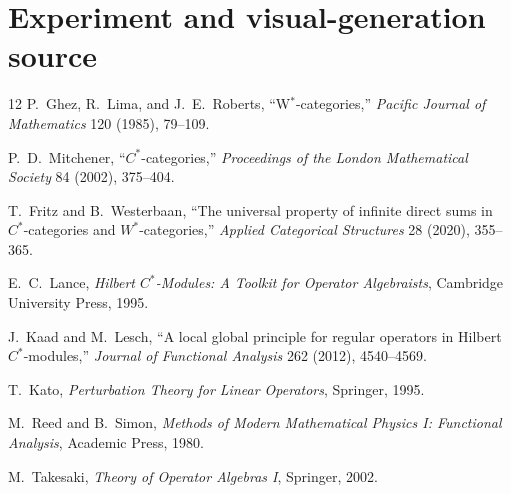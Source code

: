 \documentclass[11pt]{article}
\theoremstyle{definition}
\theoremstyle{remark}
\begin{document}
\section{Experiment and visual-generation source}

\clearpage
\begin{thebibliography}{12}
P.~Ghez, R.~Lima, and J.~E.~Roberts,
``W$^*$-categories,''
\emph{Pacific Journal of Mathematics} 120 (1985), 79--109.

P.~D.~Mitchener,
``$C^*$-categories,''
\emph{Proceedings of the London Mathematical Society} 84 (2002), 375--404.

T.~Fritz and B.~Westerbaan,
``The universal property of infinite direct sums in $C^*$-categories and $W^*$-categories,''
\emph{Applied Categorical Structures} 28 (2020), 355--365.

E.~C.~Lance,
\emph{Hilbert $C^*$-Modules: A Toolkit for Operator Algebraists},
Cambridge University Press, 1995.

J.~Kaad and M.~Lesch,
``A local global principle for regular operators in Hilbert $C^*$-modules,''
\emph{Journal of Functional Analysis} 262 (2012), 4540--4569.

T.~Kato,
\emph{Perturbation Theory for Linear Operators},
Springer, 1995.

M.~Reed and B.~Simon,
\emph{Methods of Modern Mathematical Physics I: Functional Analysis},
Academic Press, 1980.

M.~Takesaki,
\emph{Theory of Operator Algebras I},
Springer, 2002.
\end{thebibliography}
\end{document}
